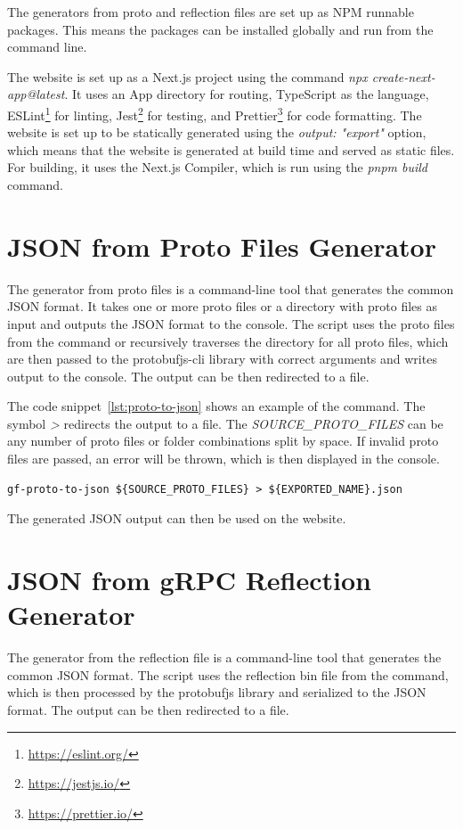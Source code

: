 The generators from proto and reflection files are set up as NPM runnable packages.
This means the packages can be installed globally and run from the command line.

The website is set up as a Next.js project using the command \textit{npx create-next-app@latest}.
It uses an App directory for routing, TypeScript as the language, ESLint\footnote{\url{https://eslint.org/}} for linting, Jest\footnote{\url{https://jestjs.io/}} for testing, and Prettier\footnote{\url{https://prettier.io/}} for code formatting.
The website is set up to be statically generated using the \textit{output: "export"} option, which means that the website is generated at build time and served as static files.
For building, it uses the Next.js Compiler, which is run using the \textit{pnpm build} command.


\section{JSON from Proto Files Generator}
The generator from proto files is a command-line tool that generates the common JSON format.
It takes one or more proto files or a directory with proto files as input and outputs the JSON format to the console.
The script uses the proto files from the command or recursively traverses the directory for all proto files, which are then passed to the protobufjs-cli library with correct arguments and writes output to the console.
The output can be then redirected to a file.

The code snippet~\ref{lst:proto-to-json} shows an example of the command.
The symbol \textit{\textgreater{}} redirects the output to a file.
The \textit{SOURCE\_PROTO\_FILES} can be any number of proto files or folder combinations split by space.
If invalid proto files are passed, an error will be thrown, which is then displayed in the console.

\begin{lstlisting}[caption={proto-to-json command example}, label={lst:proto-to-json}]
gf-proto-to-json ${SOURCE_PROTO_FILES} > ${EXPORTED_NAME}.json
\end{lstlisting}

The generated JSON output can then be used on the website.


\section{JSON from gRPC Reflection Generator}
The generator from the reflection file is a command-line tool that generates the common JSON format.
The script uses the reflection bin file from the command, which is then processed by the protobufjs library and serialized to the JSON format.
The output can be then redirected to a file.

